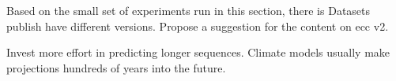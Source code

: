Based on the small set of experiments run in this section, there is 
Datasets publish have different versions. Propose a suggestion for the content on \acrshort{ecc} v2.

Invest more effort in predicting longer sequences. Climate models usually make projections hundreds of years into the future.

